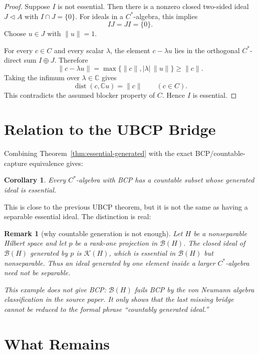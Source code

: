 \documentclass[11pt]{article}
\newtheorem{corollary}{Corollary}
\newtheorem{remark}{Remark}
\newcommand{\C}{\mathbb C}
\newcommand{\dist}{\operatorname{dist}}
\begin{document}
\begin{proof}
Suppose \(I\) is not essential.  Then there is a nonzero closed two-sided
ideal \(J\triangleleft A\) with \(I\cap J=\{0\}\).  For ideals in a
\(C^*\)-algebra, this implies
\[
        IJ=JI=\{0\}.
\]
Choose \(u\in J\) with \(\|u\|=1\).

For every \(c\in C\) and every scalar \(\lambda\), the element \(c-\lambda u\)
lies in the orthogonal \(C^*\)-direct sum \(I\oplus J\).  Therefore
\[
        \|c-\lambda u\|
        =
        \max\{\|c\|,|\lambda|\,\|u\|\}
        \ge
        \|c\|.
\]
Taking the infimum over \(\lambda\in\C\) gives
\[
        \dist(c,\C u)=\|c\|
        \qquad(c\in C).
\]
This contradicts the assumed blocker property of \(C\).  Hence \(I\) is
essential.
\end{proof}

\section*{Relation to the UBCP Bridge}

Combining Theorem~\ref{thm:essential-generated} with the exact
BCP/countable-capture equivalence gives:

\begin{corollary}
\label{cor:bridge}
Every \(C^*\)-algebra with BCP has a countable subset whose generated ideal is
essential.
\end{corollary}

This is close to the previous UBCP theorem, but it is not the same as having
a separable essential ideal.  The distinction is real:

\begin{remark}[why countable generation is not enough]
\label{rem:rankone}
Let \(H\) be a nonseparable Hilbert space and let \(p\) be a rank-one
projection in \(\mathcal B(H)\).  The closed ideal of \(\mathcal B(H)\)
generated by \(p\) is \(\mathcal K(H)\), which is essential in
\(\mathcal B(H)\) but nonseparable.  Thus an ideal generated by one element
inside a larger \(C^*\)-algebra need not be separable.

This example does not give BCP: \(\mathcal B(H)\) fails BCP by the von
Neumann algebra classification in the source paper.  It only shows that the
last missing bridge cannot be reduced to the formal phrase ``countably
generated ideal.''
\end{remark}

\section*{What Remains}
\end{document}
